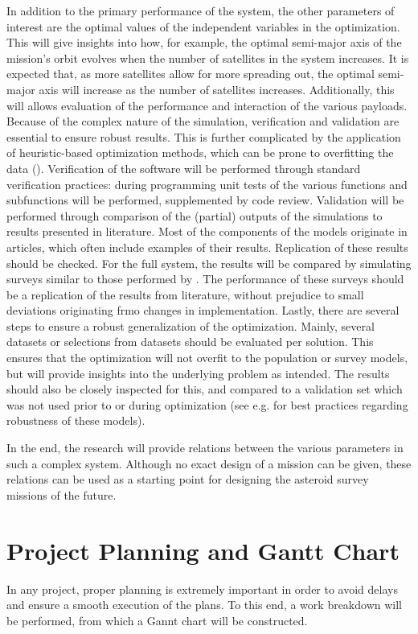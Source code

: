 \documentclass[12pt, english, NoHyper]{AE4010-template}
\begin{document}
In addition to the primary performance of the system, the other parameters of interest are the optimal values of the independent variables in the optimization. This will give insights into how, for example, the optimal semi-major axis of the mission's orbit evolves when the number of satellites in the system increases. It is expected that, as more satellites allow for more spreading out, the optimal semi-major axis will increase as the number of satellites increases. Additionally, this will allows evaluation of the performance and interaction of the various payloads. \\

Because of the complex nature of the simulation, verification and validation are essential to ensure robust results. This is further complicated by the application of heuristic-based optimization methods, which can be prone to overfitting the data (\cite{DLOne}). Verification of the software will be performed through standard verification practices: during programming unit tests of the various functions and subfunctions will be performed, supplemented by code review. Validation will be performed through comparison of the (partial) outputs of the simulations to results presented in literature. Most of the components of the models originate in articles, which often include examples of their results. Replication of these results should be checked. For the full system, the results will be compared by simulating surveys similar to those performed by \cite{NEOSDT2}. The performance of these surveys should be a replication of the results from literature, without prejudice to small deviations originating frmo changes in implementation. Lastly, there are several steps to ensure a robust generalization of the optimization. Mainly, several datasets or selections from datasets should be evaluated per solution. This ensures that the optimization will not overfit to the population or survey models, but will provide insights into the underlying problem as intended. The results should also be closely inspected for this, and compared to a validation set which was not used prior to or during optimization (see e.g. \cite{DLTwo} for best practices regarding robustness of these models).

In the end, the research will provide relations between the various parameters in such a complex system. Although no exact design of a mission can be given, these relations can be used as a starting point for designing the asteroid survey missions of the future.


\section{Project Planning and Gantt Chart}
In any project, proper planning is extremely important in order to avoid delays and ensure a smooth execution of the plans. To this end, a work breakdown will be performed, from which a Gannt chart will be constructed.
\end{document}
